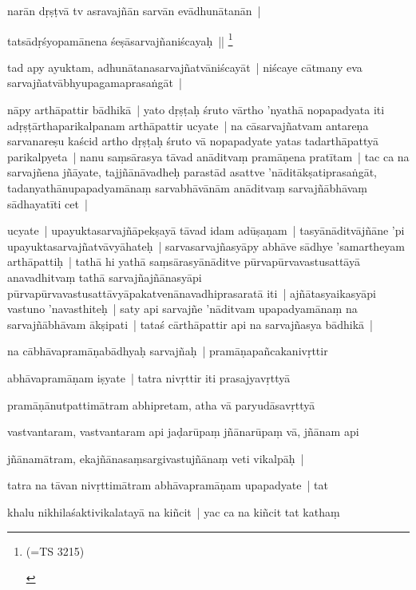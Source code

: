 \documentclass[article,a4paper]{memoir}
\begin{document}
	  \pstart narā\-n dṛṣṭvā\- tv asravajñā\-n sarvā\-n evā\-dhunā\-tanā\-n | 
	\pend
      

	  \pstart tatsā\-dṛśyopamā\-nena śeṣā\-sarvajñaniścayaḥ || \footnote{\begin{english}(=TS 3215)\end{english}}
	\pend
      

	  \pstart tad apy ayuktam, adhunā\-tanasarvajñatvā\-niścayā\-t | niścaye cā\-tmany eva sarvajñatvā\-bhyupagamaprasaṅgā\-t | 
	\pend
      

	  \pstart nā\-py arthā\-pattir bā\-dhikā\- | yato dṛṣṭaḥ śruto vā\-rtho 'nyathā\- nopapadyata iti adṛṣṭā\-rthaparikalpanam arthā\-pattir ucyate | na cā\-sarvajñatvam antareṇa sarvanareṣu kaścid artho dṛṣṭaḥ śruto vā\- nopapadyate yatas tadarthā\-pattyā\- parikalpyeta | nanu saṃsā\-rasya tā\-vad anā\-ditvaṃ pramā\-ṇena pratī\-tam | tac ca na sarvajñena jñā\-yate, tajjñā\-nā\-vadheḥ parastā\-d asattve 'nā\-ditā\-kṣatiprasaṅgā\-t, tadanyathā\-nupapadyamā\-naṃ sarvabhā\-vā\-nā\-m anā\-ditvaṃ sarvajñā\-bhā\-vaṃ sā\-dhayatī\-ti cet | 
	\pend
      

	  \pstart ucyate | upayuktasarvajñā\-pekṣayā\- tā\-vad idam adū\-ṣaṇam | tasyā\-nā\-ditvā\-jñā\-ne 'pi upayuktasarvajñatvā\-vyā\-hateḥ | sarvasarvajñasyā\-py abhā\-ve sā\-dhye 'samartheyam arthā\-pattiḥ | tathā\- hi yathā\- saṃsā\-rasyā\-nā\-ditve pū\-rvapū\-rvavastusattā\-yā\- anavadhitvaṃ tathā\- sarvajñajñā\-nasyā\-pi pū\-rvapū\-rvavastusattā\-vyā\-pakatvenā\-navadhiprasaratā\- iti | ajñā\-tasyaikasyā\-pi vastuno 'navasthiteḥ | saty api sarvajñe 'nā\-ditvam upapadyamā\-naṃ na sarvajñā\-bhā\-vam ā\-kṣipati | tataś cā\-rthā\-pattir api na sarvajñasya bā\-dhikā\- | 
	\pend
      

	  \pstart na cā\-bhā\-vapramā\-ṇabā\-dhyaḥ sarvajñaḥ | pramā\-ṇapañcakanivṛttir 
	\pend
      

	  \pstart abhā\-vapramā\-ṇam iṣyate | tatra nivṛttir iti prasajyavṛttyā\- 
	\pend
      

	  \pstart pramā\-ṇā\-nutpattimā\-tram abhipretam, atha vā\- paryudā\-savṛttyā\- 
	\pend
      

	  \pstart vastvantaram, vastvantaram api jaḍarū\-paṃ jñā\-narū\-paṃ vā\-, jñā\-nam api 
	\pend
      

	  \pstart jñā\-namā\-tram, ekajñā\-nasaṃsargivastujñā\-naṃ veti vikalpā\-ḥ | 
	\pend
      

	  \pstart tatra na tā\-van nivṛttimā\-tram abhā\-vapramā\-ṇam upapadyate | tat 
	\pend
      

	  \pstart khalu nikhilaśaktivikalatayā\- na kiñcit | yac ca na kiñcit tat kathaṃ 
	\pend
      
\end{document}
